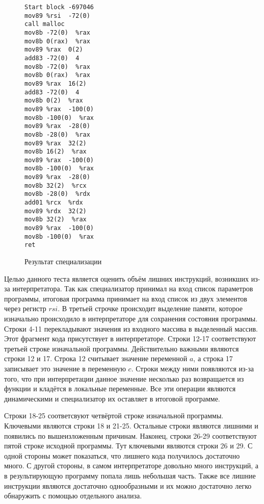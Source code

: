 \documentclass{spbau-diploma}
\begin{document}
\begin{figure}[t]
\begin{multicols}{2}
\begin{lstlisting}
Start block -697046
mov89 %rsi  -72(0) 
call malloc
mov8b -72(0)  %rax
mov8b 0(rax)  %rax
mov89 %rax  0(2)
add83 -72(0)  4
mov8b -72(0)  %rax
mov8b 0(rax)  %rax
mov89 %rax  16(2)
add83 -72(0)  4
mov8b 0(2)  %rax 
mov89 %rax  -100(0) 
mov8b -100(0)  %rax 
mov89 %rax  -28(0) 
mov8b -28(0)  %rax 
mov89 %rax  32(2)
mov8b 16(2)  %rax 
mov89 %rax  -100(0) 
mov8b -100(0)  %rax 
mov89 %rax  -28(0) 
mov8b 32(2)  %rcx 
mov8b -28(0)  %rdx 
add01 %rcx  %rdx 
mov89 %rdx  32(2) 
mov8b 32(2)  %rax 
mov89 %rax  -100(0) 
mov8b -100(0)  %rax 
ret
\end{lstlisting}
\end{multicols}
\caption{ Результат специализации}
\label{fig:specadd}
\end{figure}

Целью данного теста является оценить объём лишних инструкций, возникших из-за интерпретатора. Так как специализатор принимал на вход список параметров программы, итоговая программа принимает на вход список из двух элементов через регистр $rsi$. В третьей строчке происходит выделение памяти, которое изначально происходило в интерпретаторе для сохранения состояния программы. Строки 4-11 перекладывают значения из входного массива в выделенный массив. Этот фрагмент кода присутствует в интерпретаторе. Строки 12-17 соответствуют третьей строке изначальной программы. Действительно важными являются строки 12 и 17. Строка 12 считывает значение переменной $a$, а строка 17 записывает это значение в переменную $c$. Строки между ними появляются из-за того, что при интерпретации данное значение несколько раз возвращается из функции и кладётся в локальные переменные. Все эти операции являются динамическими и специализатор их оставляет в итоговой программе. 

Строки 18-25 соответсвуют четвёртой строке изначальной программы. Ключевыми являются строки 18 и 21-25. Остальные строки являются лишними и появились по вышеизложенным причинам. Наконец, строки 26-29 соответствуют пятой строке исходной программы. Тут ключевыми являются строки 26 и 29. С одной стороны может показаться, что лишнего кода получилось достаточно много. С другой стороны, в самом интерпретаторе довольно много инструкций, а в результирующую программу попала лишь небольшая часть. Также все лишние инструкции являются достаточно однообразными и их можно достаточно легко обнаружить с помощью отдельного анализа.
\end{document}
